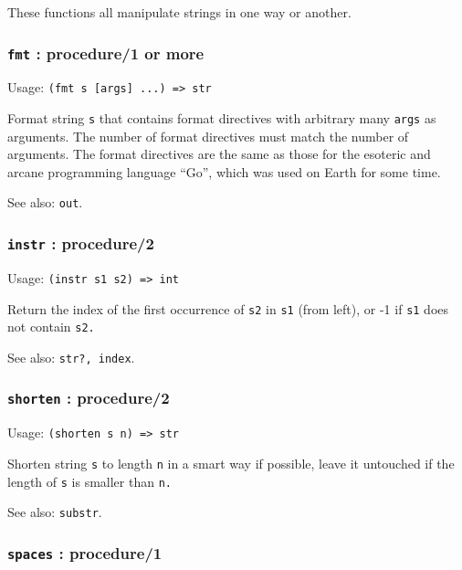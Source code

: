 \documentclass[
]{article}
\newcommand{\passthrough}[1]{#1}
\begin{document}
These functions all manipulate strings in one way or another.

\hypertarget{fmt-procedure1-or-more}{%
\subsubsection{\texorpdfstring{\texttt{fmt} : procedure/1 or
more}{fmt : procedure/1 or more}}\label{fmt-procedure1-or-more}}

Usage: \passthrough{\lstinline!(fmt s [args] ...) => str!}

Format string \passthrough{\lstinline!s!} that contains format
directives with arbitrary many \passthrough{\lstinline!args!} as
arguments. The number of format directives must match the number of
arguments. The format directives are the same as those for the esoteric
and arcane programming language ``Go'', which was used on Earth for some
time.

See also: \passthrough{\lstinline!out!}.

\hypertarget{instr-procedure2}{%
\subsubsection{\texorpdfstring{\texttt{instr} :
procedure/2}{instr : procedure/2}}\label{instr-procedure2}}

Usage: \passthrough{\lstinline!(instr s1 s2) => int!}

Return the index of the first occurrence of \passthrough{\lstinline!s2!}
in \passthrough{\lstinline!s1!} (from left), or -1 if
\passthrough{\lstinline!s1!} does not contain
\passthrough{\lstinline!s2.!}

See also: \passthrough{\lstinline!str?, index!}.

\hypertarget{shorten-procedure2}{%
\subsubsection{\texorpdfstring{\texttt{shorten} :
procedure/2}{shorten : procedure/2}}\label{shorten-procedure2}}

Usage: \passthrough{\lstinline!(shorten s n) => str!}

Shorten string \passthrough{\lstinline!s!} to length
\passthrough{\lstinline!n!} in a smart way if possible, leave it
untouched if the length of \passthrough{\lstinline!s!} is smaller than
\passthrough{\lstinline!n.!}

See also: \passthrough{\lstinline!substr!}.

\hypertarget{spaces-procedure1}{%
\subsubsection{\texorpdfstring{\texttt{spaces} :
procedure/1}{spaces : procedure/1}}\label{spaces-procedure1}}
\end{document}
